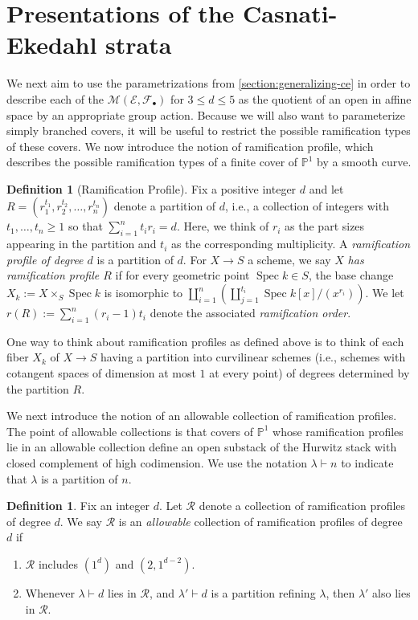 \documentclass[12 pt]{amsart}
\newcommand{\rboxed}[1]{#1}
\theoremstyle{plain}
\theoremstyle{definition}
\newtheorem{definition}[theorem]{Definition}
\theoremstyle{remark}
\numberwithin{equation}{section}
\newcommand\bp{\mathbb P}
\newcommand\sce{\mathscr E}
\newcommand\scf{\mathscr F}
\newcommand \ra{\rightarrow}
\DeclareMathOperator\spec{\operatorname{Spec}}
\newcommand\ce{\mathscr M} %
\begin{document}
\section{Presentations of the Casnati-Ekedahl strata}
\label{section:presentations-of-ce}

We next aim to use the parametrizations  from
\autoref{section:generalizing-ce} in order to describe each of the $\ce(\sce,
\scf_\bullet)$ for $3 \leq d \leq 5$ as the quotient of an open in affine space
by an appropriate group action.
Because we will also want to parameterize simply branched covers, it will be
useful to restrict the possible ramification types of these covers.
We now introduce the notion of ramification profile, which describes the
possible ramification types of a finite cover of $\bp^1$ by a smooth curve.


\begin{definition}[Ramification Profile] \label{definition:ramfication-profile}
	Fix a positive integer $d$ and let $R = (r_1^{t_1}, r_2^{t_2}, \ldots, r_n^{t_n})$ denote a partition
	of $d$, i.e., a collection of integers with $t_1, \ldots, t_n \geq 1$
	so that $\sum_{i=1}^n t_i r_i = d$.  Here, we think of $r_i$ as the
	part sizes appearing in the partition and $t_i$ as the corresponding
	multiplicity.  A {\em ramification profile of degree $d$} is a
	partition of $d$.  For $X \ra S$ a scheme, we say $X$ {\em has
	ramification profile $R$} if for every geometric point $\spec k \in S$,
	the base change $X_k := X \times_S \spec k$ is isomorphic to
	$\coprod_{i=1}^n \left( \coprod_{j=1}^{t_i} \spec k[x]/(x^{r_i})
	\right)$.  We let $r(R) := \sum_{i=1}^n (r_i-1)t_i$ denote the
	associated {\em ramification order}.  \end{definition}
One way to think about ramification profiles as defined above is to think of
each
fiber $X_k$ of $X \to S$ having a partition into curvilinear schemes (i.e., schemes with cotangent spaces
	of dimension at most $1$ at every point) of degrees determined by the
	partition $R$.  

We next introduce the notion of an allowable collection of ramification
profiles. The point of allowable collections is that covers of $\bp^1$ whose
ramification profiles lie in an allowable collection define an open substack of
the Hurwitz stack with closed complement of high codimension.
We use the notation $\lambda \vdash n$ to indicate that $\lambda$ is a partition
of $n$.

\begin{definition} \label{definition:allowable} Fix an integer $d$. Let
	$\rboxed{\mathcal R}$ denote a collection of ramification profiles of
	degree $d$.
	We say
	$\mathcal R$ is an {\em allowable} collection of ramification profiles of
	degree $d$ if \begin{enumerate} \item $\mathcal R$ includes $(1^d)$ and
			$(2, 1^{d-2})$.
		\item Whenever $\lambda \vdash d$ lies in
			$\mathcal R$, and $\lambda' \vdash d$ is a partition
			refining $\lambda$,
			then $\lambda'$ also lies in $\mathcal R$.
\end{enumerate} \end{definition}
\end{document}
